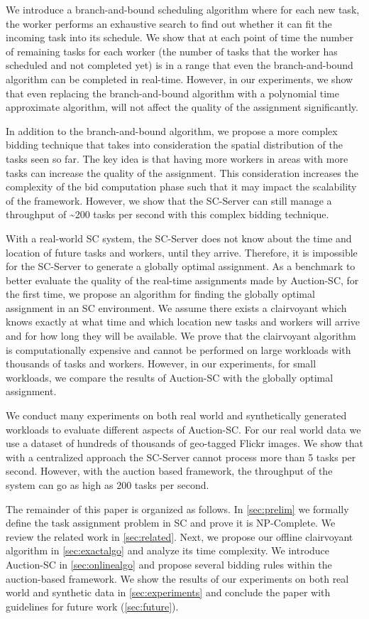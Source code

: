 We introduce a branch-and-bound scheduling algorithm where for each new task, the worker performs an exhaustive search to find out whether it can fit the incoming task into its schedule. We show that at each point of time the number of remaining tasks for each worker (the number of tasks that the worker has scheduled and not completed yet) is in a range that even the branch-and-bound algorithm can be completed in real-time. However, in our experiments, we show that even replacing the branch-and-bound algorithm with a polynomial time approximate algorithm, will not affect the quality of the assignment significantly.

In addition to the branch-and-bound algorithm, we propose a more complex bidding technique that takes into consideration the spatial distribution of the tasks seen so far. The key idea is that having more workers in areas with more tasks can increase the quality of the assignment. This consideration increases the complexity of the bid computation phase such that it may impact the scalability of the framework. However, we show that the SC-Server can still manage a throughput of \textasciitilde 200 tasks per second with this complex bidding technique.

With a real-world SC system, the SC-Server does not know about the time and location of future tasks and workers, until they arrive. Therefore, it is impossible for the SC-Server to generate a globally optimal assignment. As a benchmark to better evaluate the quality of the real-time assignments made by Auction-SC, for the first time, we propose an algorithm for finding the globally optimal assignment in an SC environment. We assume there exists a clairvoyant which knows exactly at what time and which location new tasks and workers will arrive and for how long they will be available. We prove that the clairvoyant algorithm is computationally expensive and cannot be performed on large workloads with thousands of tasks and workers. However, in our experiments, for small workloads, we compare the results of Auction-SC with the globally optimal assignment.

We conduct many experiments on both real world and synthetically generated workloads to evaluate different aspects of Auction-SC. For our real world data we use a dataset of hundreds of thousands of geo-tagged Flickr images. We show that with a centralized approach the SC-Server cannot process more than 5 tasks per second. However, with the auction based framework, the throughput of the system can go as high as 200 tasks per second. 

The remainder of this paper is organized as follows. In \cref{sec:prelim} we formally define the task assignment problem in SC and prove it is NP-Complete. We review the related work in \cref{sec:related}. Next, we propose our offline clairvoyant algorithm in \cref{sec:exactalgo} and analyze its time complexity. We introduce Auction-SC in \cref{sec:onlinealgo} and propose several bidding rules within the auction-based framework. We show the results of our experiments on both real world and synthetic data in \cref{sec:experiments} and conclude the paper with guidelines for future work (\cref{sec:future}).